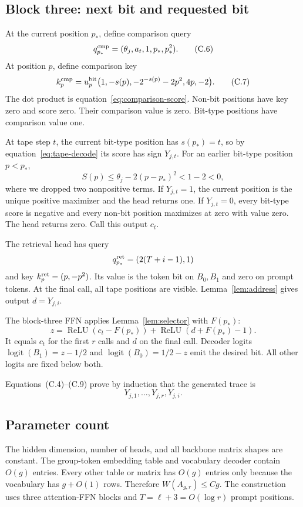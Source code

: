\subsection{Block three: next bit and requested bit}\label{app:block3}

At the current position $p_*$, define comparison query
\[
 q^{\rm cmp}_{p_*}=(\theta_j,a_t,1,p_*,p_*^2).
 \tag{C.6}
\]
At position $p$, define comparison key
\[
 k^{\rm cmp}_p=u^{\rm bit}_p
 \bigl(1,-s(p),-2^{-s(p)}-2p^2,4p,-2\bigr).
 \tag{C.7}
\]
The dot product is equation~\eqref{eq:comparison-score}. Non-bit positions have key zero and score
zero. Their comparison value is zero. Bit-type positions have comparison value one.

At tape step $t$, the current bit-type position has $s(p_*)=t$, so by equation~\eqref{eq:tape-decode}
its score has sign $Y_{j,t}$. For an earlier bit-type position $p<p_*$,
\[
 S(p)\leq\theta_j-2(p-p_*)^2<1-2<0,
 \tag{C.8}
\]
where we dropped two nonpositive terms. If $Y_{j,t}=1$, the current position is the unique positive
maximizer and the head returns one. If $Y_{j,t}=0$, every bit-type score is negative and every
non-bit position maximizes at zero with value zero. The head returns zero. Call this output $c_t$.

The retrieval head has query
\[
 q^{\rm ret}_{p_*}=(2(T+i-1),1)
\]
and key $k^{\rm ret}_p=(p,-p^2)$. Its value is the token bit on $B_0,B_1$ and zero on prompt
tokens. At the final call, all tape positions are visible. Lemma~\ref{lem:address} gives output
$d=Y_{j,i}$.

The block-three FFN applies Lemma~\ref{lem:selector} with $F(p_*)$:
\[
 z=\operatorname{ReLU}(c_t-F(p_*))
 +\operatorname{ReLU}(d+F(p_*)-1).
 \tag{C.9}
\]
It equals $c_t$ for the first $r$ calls and $d$ on the final call. Decoder logits
$\operatorname{logit}(B_1)=z-1/2$ and
$\operatorname{logit}(B_0)=1/2-z$ emit the desired bit. All other logits are fixed below both.

Equations~(C.4)--(C.9) prove by induction that the generated trace is
\[
 Y_{j,1},\ldots,Y_{j,r},Y_{j,i}.
\]

\subsection{Parameter count}\label{app:count}

The hidden dimension, number of heads, and all backbone matrix shapes are constant. The group-token
embedding table and vocabulary decoder contain $O(g)$ entries. Every other table or matrix has
$O(g)$ entries only because the vocabulary has $g+O(1)$ rows. Therefore $W(A_{g,r})\leq Cg$.
The construction uses three attention-FFN blocks and $T=\ell+3=O(\log r)$ prompt positions.

